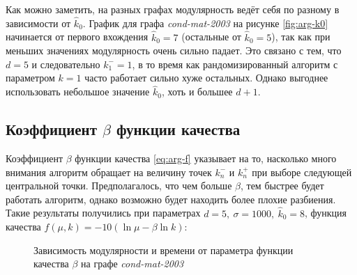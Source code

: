 Как можно заметить, на разных графах модулярность ведёт себя по разному в зависимости от $\hat{k}_0$. График для графа \emph{cond-mat-2003} на рисунке \ref{fig:arg-k0} начинается от первого вхождения $\hat{k}_0 = 7$ (остальные от $\hat{k}_0 = 5$), так как при меньших значениях модулярность очень сильно падает. Это связано с тем, что $d = 5$ и следовательно $k_1^{-} = 1$, в то время как рандомизированный алгоритм с параметром $k = 1$ часто работает сильно хуже остальных. Однако выгоднее использовать небольшое значение $\hat{k}_0$, хоть и большее $d + 1$.



\subsection{Коэффициент $\beta$ функции качества}

Коэффициент $\beta$ функции качества \eqref{eq:arg-f} указывает на то, насколько много внимания алгоритм обращает на величину точек $k^{-}_n$ и $k^{+}_n$ при выборе следующей центральной точки. Предполагалось, что чем больше $\beta$, тем быстрее будет работать алгоритм, однако возможно будет находить более плохие разбиения. Такие результаты получились при параметрах $d = 5,\ \sigma = 1000,\ \hat{k}_0 = 8$, функция качества $f(\mu, k) = -10(\ln \mu - \beta \ln k)$:

\begin{figure}[H]
	\caption{Зависимость модулярности и времени от параметра функции качества $\beta$ на графе \emph{cond-mat-2003}}
\end{figure}



